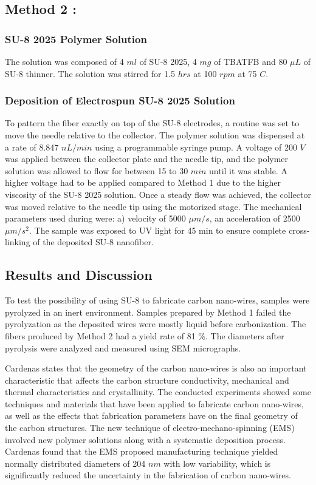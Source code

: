 \subsection{Method 2 : }

\subsubsection{SU-8 2025 Polymer Solution}
The solution was composed of 4 $ml$ of SU-8 2025, 4 $mg$ of TBATFB and 80 $\mu L$ of SU-8 thinner. The solution was stirred for 1.5 $hrs$ at 100 $rpm$ at 75 \textdegree{}$C$.

\subsubsection{Deposition of Electrospun SU-8 2025 Solution}
To pattern the fiber exactly on top of the SU-8 electrodes, a routine was set to move the needle relative to the collector. The polymer solution was dispensed at a rate of 8.847 $nL / min$ using a programmable syringe pump. A voltage of 200 $V$ was applied between the collector plate and the needle tip, and the polymer solution was allowed to flow for between 15 to 30 $min$ until it was stable. A higher voltage had to be applied compared to Method 1 due to the higher viscosity of the SU-8 2025 solution. Once a steady flow was achieved, the collector was moved relative to the needle tip using the motorized stage. The mechanical parameters used during were: a) velocity of 5000 $\mu m/s$, an acceleration of 2500 $\mu m/s^{2}$. The sample was exposed to UV light for 45 min to ensure complete cross-linking of the deposited SU-8 nanofiber.

\subsection{Results and Discussion}
To test the possibility of using SU-8 to fabricate carbon nano-wires, samples were pyrolyzed in an inert environment. Samples prepared by Method 1 failed the pyrolyzation as the deposited wires were mostly liquid before carbonization. The fibers produced by Method 2 had a yield rate of 81 $\%$. The diameters after pyrolysis were analyzed and measured using SEM micrographs.

Cardenas \cite{Cardenas2017} states that the geometry of the carbon nano-wires is also an important characteristic that affects the carbon structure conductivity, mechanical and thermal characteristics and crystallinity. The conducted experiments showed some techniques and materials that have been applied to fabricate carbon nano-wires, as well as the effects that fabrication parameters have on the final geometry of the carbon structures. The new technique of electro-mechano-spinning (EMS) involved new polymer solutions along with a systematic deposition process. Cardenas \cite{Cardenas2017} found that the EMS proposed manufacturing technique yielded normally distributed diameters of 204 $nm$ with low variability, which is significantly reduced the uncertainty in the fabrication of carbon nano-wires.

